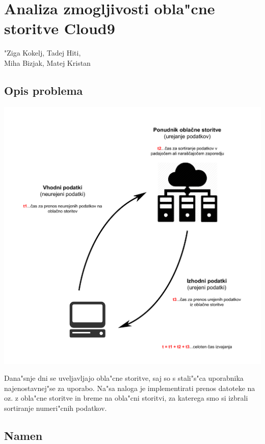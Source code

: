 \chapter[Analiza zmogljivosti obla"cne storitve c9]{Analiza zmogljivosti obla"cne storitve Cloud9}

\pagestyle{fancy}
\fancyhf{}
\fancyhead[LE,RO]{\thepage}
\fancyhead[RE,LO]{\leftmark}

\huge "Ziga Kokelj, Tadej Hiti,\\Miha Bizjak, Matej Kristan
\normalsize
\bigskip

\section{Opis problema}

\includegraphics[width=\linewidth]{zzrs_opis_problema.pdf}

\noindent Dana"snje dni se uveljavljajo obla"cne storitve, saj so s stali"s"ca uporabnika najenostavnej"se za uporabo. Na"sa naloga je implementirati prenos datoteke na oz. z obla"cne storitve in breme na obla"cni storitvi, za katerega smo si izbrali sortiranje numeri"cnih podatkov. 


\section{Namen}

